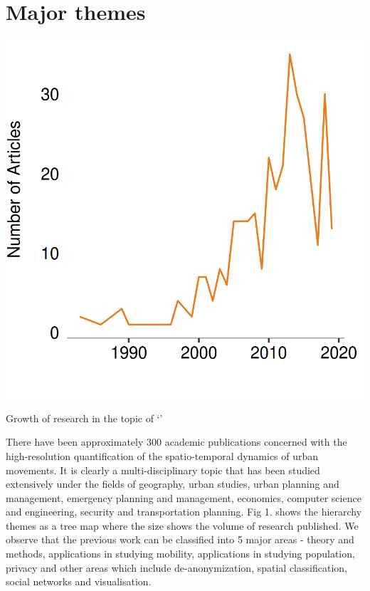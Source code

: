\section{Major themes}

\begin{marginfigure}
  \includegraphics{images/literature-timeline.png}
  \caption{Growth of research in the topic of `'}
  \label{figure:literature:timeline}
\end{marginfigure}
\marginnote[1em]{\fontsize{7}{7}\textit{}}

There have been approximately 300 academic publications concerned with the high-resolution quantification of the spatio-temporal dynamics of urban movements.
It is clearly a multi-disciplinary topic that has been studied extensively under the fields of geography, urban studies, urban planning and management, emergency planning and management, economics, computer science and engineering, security and transportation planning.
Fig 1. shows the hierarchy themes as a tree map where the size shows the volume of research published.
We observe that the previous work can be classified into 5 major areas  - theory and methods, applications in studying mobility, applications in studying population, privacy and other areas which include de-anonymization, spatial classification, social networks and visualisation.

